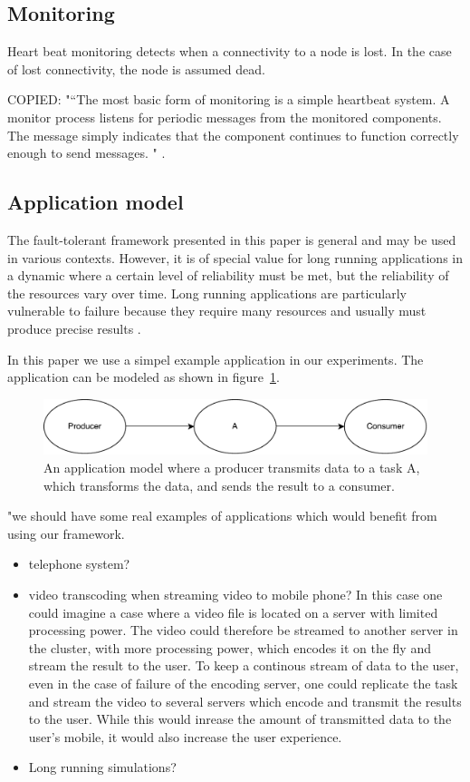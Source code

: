 \documentclass{cslthse-msc}
\begin{document}
\subsection{Monitoring}
Heart beat monitoring detects when a connectivity to a node is lost. In the case of lost connectivity, the node is assumed dead.

COPIED: "“The most basic form of monitoring is a simple heartbeat system. A monitor process listens for periodic messages from the monitored components. The message simply indicates that the component continues to function correctly enough to send messages. " \cite{surveyFaultParallel}.

\subsection{Application model}
The fault-tolerant framework presented in this paper is general and may be used in various contexts. However, it is of special value for long running applications in a dynamic where a certain level of reliability must be met, but the reliability of the resources vary over time. Long running applications are particularly vulnerable to failure because they require many resources and usually must produce precise results \cite{relGridSystems}.

In this paper we use a simpel example application in our experiments. The application can be modeled as shown in figure~\ref{fig:app_model}.

\begin{figure}[!hbt]
\centering
\includegraphics[scale=0.5]{images/app_model.pdf} 
\caption{An application model where a producer transmits data to a task A, which transforms the data, and sends the result to a consumer.}\label{fig:app_model}
\end{figure}

"we should have some real examples of applications which would benefit from using our framework. 
\begin{itemize}
\item telephone system?
\item video transcoding when streaming video to mobile phone? In this case one could imagine a case where a video file is located on a server with limited processing power. The video could therefore be streamed to another server in the cluster, with more processing power, which encodes it on the fly and stream the result to the user. To keep a continous stream of data to the user, even in the case of failure of the encoding server, one could replicate the task and stream the video to several servers which encode and transmit the results to the user. While this would inrease the amount of transmitted data to the user's mobile, it would also increase the user experience.
\item Long running simulations? \cite{relModelDistSimSystem}
\end{itemize}
\end{document}

